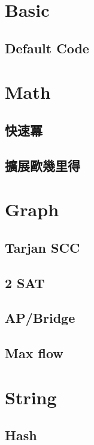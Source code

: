 \section{Basic}
\subsection{Default Code}


\section{Math}
\subsection{快速冪} 

\subsection{擴展歐幾里得} 


\section{Graph}
\subsection{Tarjan SCC} 

\subsection{2 SAT} 

\subsection{AP/Bridge} 

\subsection{Max flow} 


\section{String}
\subsection{Hash} 

